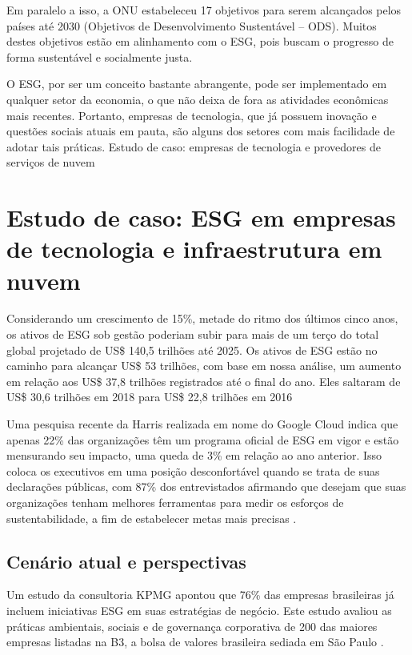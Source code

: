 \documentclass[12pt]{article}
\begin{document}
	Em paralelo a isso, a ONU estabeleceu 17 objetivos para serem alcançados pelos países até 2030 (Objetivos de Desenvolvimento Sustentável – ODS). Muitos destes objetivos estão em alinhamento com o ESG, pois buscam o progresso de forma sustentável e socialmente justa.
	
	O ESG, por ser um conceito bastante abrangente, pode ser implementado em qualquer setor da economia, o que não deixa de fora as atividades econômicas mais recentes. Portanto, empresas de tecnologia, que já possuem inovação e questões sociais atuais em pauta, são alguns dos setores com mais facilidade de adotar tais práticas.
	Estudo de caso: empresas de tecnologia e provedores de serviços de nuvem
	
	\section*{Estudo de caso: ESG em empresas de tecnologia e infraestrutura em nuvem}
	
	Considerando um crescimento de 15\%, metade do ritmo dos últimos cinco anos, os ativos de ESG sob gestão poderiam subir para mais de um terço do total global projetado de US\$ 140,5 trilhões até 2025. Os ativos de ESG estão no caminho para alcançar US\$ 53 trilhões, com base em nossa análise, um aumento em relação aos US\$ 37,8 trilhões registrados até o final do ano. Eles saltaram de US\$ 30,6 trilhões em 2018 para US\$ 22,8 trilhões em 2016 \cite{bloombergprofessionalservicesESGAssetsMay2021}
	
	Uma pesquisa recente da Harris realizada em nome do Google Cloud indica que apenas 22\% das organizações têm um programa oficial de ESG em vigor e estão mensurando seu impacto, uma queda de 3\% em relação ao ano anterior. Isso coloca os executivos em uma posição desconfortável quando se trata de suas declarações públicas, com 87\% dos entrevistados afirmando que desejam que suas organizações tenham melhores ferramentas para medir os esforços de sustentabilidade, a fim de estabelecer metas mais precisas \cite{googlecloudUnderstandingHowYour2023}.
	
	\subsection*{Cenário atual e perspectivas}
	
	Um estudo da consultoria KPMG apontou que 76\% das empresas brasileiras já incluem iniciativas ESG em suas estratégias de negócio. Este estudo avaliou as práticas ambientais, sociais e de governança corporativa de 200 das maiores empresas listadas na B3, a bolsa de valores brasileira sediada em São Paulo \cite{kpmgKPMGESGYearbook2023}.
	
\end{document}
